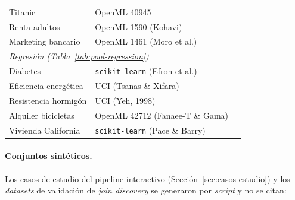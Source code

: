 \begin{table}[H]
\begin{tabular}{lll}
Titanic               & OpenML 40945                               & \cite{ds_titanic} \\
Renta adultos         & OpenML 1590 (Kohavi)                       & \cite{ds_adult} \\
Marketing bancario    & OpenML 1461 (Moro et al.)                  & \cite{ds_bank} \\
\midrule
\multicolumn{3}{l}{\textit{Regresión (Tabla~\ref{tab:pool-regression})}} \\[2pt]
Diabetes              & \texttt{scikit-learn} (Efron et al.)       & \cite{ds_diabetes} \\
Eficiencia energética & UCI (Tsanas \& Xifara)                     & \cite{ds_energyeff} \\
Resistencia hormigón  & UCI (Yeh, 1998)                            & \cite{ds_concrete} \\
Alquiler bicicletas   & OpenML 42712 (Fanaee-T \& Gama)            & \cite{ds_bikesharing} \\
Vivienda California   & \texttt{scikit-learn} (Pace \& Barry)      & \cite{ds_calhousing} \\
\bottomrule
\end{tabular}
\end{table}

\paragraph{Conjuntos sintéticos.}
Los casos de estudio del pipeline interactivo (Sección~\ref{sec:casos-estudio})
y los \textit{datasets} de validación de \textit{join discovery} se generaron por
\textit{script} y no se citan:

